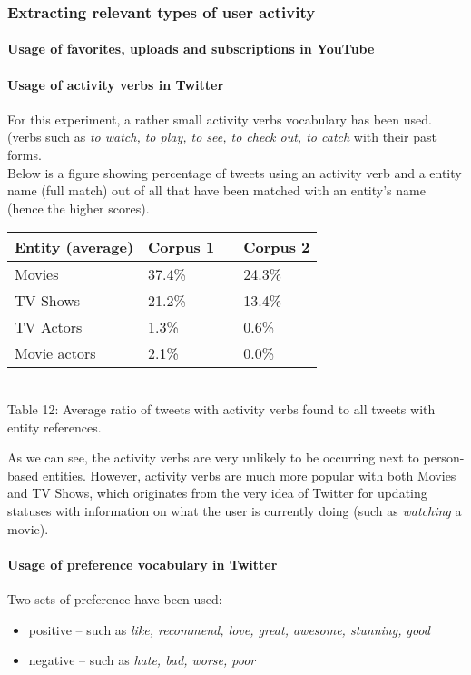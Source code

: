 \subsubsection{Extracting relevant types of user activity}

\paragraph{Usage of favorites, uploads and subscriptions in YouTube}

\paragraph{Usage of activity verbs in Twitter}
For this experiment, a rather small activity verbs vocabulary has been used. (verbs such
as \textit{to watch, to play, to see, to check out, to catch} with their past forms.
\\ Below is a figure showing percentage of tweets using an activity verb
and a entity name (full match) out of all that have been matched with an
entity's name (hence the higher scores).

\begin{center}
  \begin{tabular}{ | p{4cm} | p{2cm} | p{1cm}| p{2cm} | } \hline
    Entity (average) & Corpus 1 & & Corpus 2 \\ \hline
    Movies & 37.4\% & & 24.3\% \\ \hline
    TV Shows & 21.2\% & & 13.4\% \\ \hline
    TV Actors & 1.3\% & & 0.6\% \\ \hline
    Movie actors & 2.1\% & & 0.0\% \\ \hline
  \end{tabular} \\
  Table 12: Average ratio of tweets with activity verbs found to all tweets with entity references. \\
\end{center}

As we can see, the activity verbs are very unlikely to be occurring next to
person-based entities. However, activity verbs are much more popular with both
Movies and TV Shows, which originates from the very idea of Twitter for
updating statuses with information on what the user is currently doing (such as \textit{watching}
a movie).

\paragraph{Usage of preference vocabulary in Twitter}
Two sets of preference have been used:
\begin{itemize}
  \item positive -- such as \textit{like, recommend, love, great, awesome, stunning, good}
  \item negative -- such as \textit{hate, bad, worse, poor}
\end{itemize}


